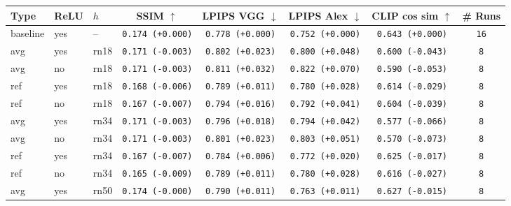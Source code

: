 \begin{tabular}{|l|l|l|c|c|c|c|c|}
\hline
Type & ReLU & $h$ & SSIM $\uparrow$ & LPIPS VGG $\downarrow$ & LPIPS Alex $\downarrow$ & CLIP cos sim $\uparrow$ & \# Runs \\
\hline
\rowcolor{verylightgray}baseline & yes & -- & \texttt{0.174 {\color{black}(+0.000)}} & \texttt{0.778 {\color{black}(+0.000)}} & \texttt{0.752 {\color{black}(+0.000)}} & \texttt{0.643 {\color{black}(+0.000)}} & \texttt{16} \\
\hline
avg & yes & rn18 & \texttt{0.171 {\color{red}(-0.003)}} & \texttt{0.802 {\color{red}(+0.023)}} & \texttt{0.800 {\color{red}(+0.048)}} & \texttt{0.600 {\color{red}(-0.043)}} & \texttt{8} \\
avg & no & rn18 & \texttt{0.171 {\color{red}(-0.003)}} & \texttt{0.811 {\color{red}(+0.032)}} & \texttt{0.822 {\color{red}(+0.070)}} & \texttt{0.590 {\color{red}(-0.053)}} & \texttt{8} \\
ref & yes & rn18 & \texttt{0.168 {\color{red}(-0.006)}} & \texttt{0.789 {\color{red}(+0.011)}} & \texttt{0.780 {\color{red}(+0.028)}} & \texttt{0.614 {\color{red}(-0.029)}} & \texttt{8} \\
ref & no & rn18 & \texttt{0.167 {\color{red}(-0.007)}} & \texttt{0.794 {\color{red}(+0.016)}} & \texttt{0.792 {\color{red}(+0.041)}} & \texttt{0.604 {\color{red}(-0.039)}} & \texttt{8} \\
\hline
avg & yes & rn34 & \texttt{0.171 {\color{red}(-0.003)}} & \texttt{0.796 {\color{red}(+0.018)}} & \texttt{0.794 {\color{red}(+0.042)}} & \texttt{0.577 {\color{red}(-0.066)}} & \texttt{8} \\
avg & no & rn34 & \texttt{0.171 {\color{red}(-0.003)}} & \texttt{0.801 {\color{red}(+0.023)}} & \texttt{0.803 {\color{red}(+0.051)}} & \texttt{0.570 {\color{red}(-0.073)}} & \texttt{8} \\
ref & yes & rn34 & \texttt{0.167 {\color{red}(-0.007)}} & \texttt{0.784 {\color{red}(+0.006)}} & \texttt{0.772 {\color{red}(+0.020)}} & \texttt{0.625 {\color{red}(-0.017)}} & \texttt{8} \\
ref & no & rn34 & \texttt{0.165 {\color{red}(-0.009)}} & \texttt{0.789 {\color{red}(+0.011)}} & \texttt{0.780 {\color{red}(+0.028)}} & \texttt{0.616 {\color{red}(-0.027)}} & \texttt{8} \\
\hline
avg & yes & rn50 & \texttt{0.174 {\color{black}(-0.000)}} & \texttt{0.790 {\color{red}(+0.011)}} & \texttt{0.763 {\color{red}(+0.011)}} & \texttt{0.627 {\color{red}(-0.015)}} & \texttt{8} \\

\end{tabular}
